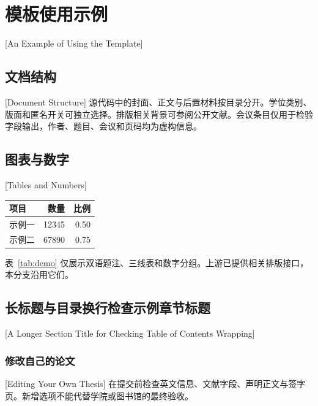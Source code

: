\chapter{模板使用示例}[An Example of Using the Template]
\section{文档结构}[Document Structure]
源代码中的封面、正文与后置材料按目录分开。学位类别、版面和匿名开关可独立选择。排版相关背景可参阅公开文献\cite{lamport1994}。会议条目\cite{demoConference}仅用于检验字段输出，作者、题目、会议和页码均为虚构信息。
\section{图表与数字}[Tables and Numbers]
\begin{table}[htbp]
  \centering
  \begin{tabular}{lrr}
    \toprule
    项目 & 数量 & 比例 \\
    \midrule
    示例一 & \num{12345} & 0.50 \\
    示例二 & \num{67890} & 0.75 \\
    \bottomrule
  \end{tabular}
\end{table}
表~\ref{tab:demo} 仅展示双语题注、三线表和数字分组。上游已提供相关排版接口，本分支沿用它们。
\section{长标题与目录换行检查示例章节标题}[A Longer Section Title for Checking Table of Contents Wrapping]
\subsection{修改自己的论文}[Editing Your Own Thesis]
在提交前检查英文信息、文献字段、声明正文与签字页。新增选项不能代替学院或图书馆的最终验收。

